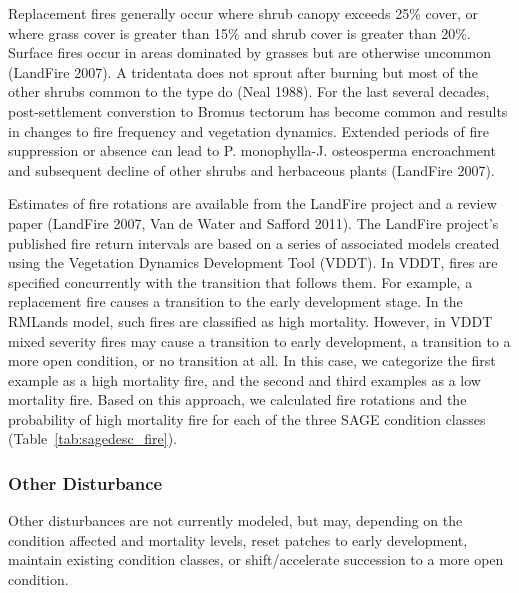 Replacement fires generally occur where shrub canopy exceeds 25\% cover, or where grass cover is greater than 15\% and shrub cover is greater than 20\%. Surface fires occur in areas dominated by grasses but are otherwise uncommon (LandFire 2007). A tridentata does not sprout after burning but most of the other shrubs common to the type do (Neal 1988). For the last several decades, post-settlement converstion to Bromus tectorum has become common and results in changes to fire frequency and vegetation dynamics. Extended periods of fire suppression or absence can lead to P. monophylla-J. osteosperma encroachment and subsequent decline of other shrubs and herbaceous plants (LandFire 2007). 

Estimates of fire rotations are available from the LandFire project and a review paper (LandFire 2007, Van de Water and Safford 2011). The LandFire project’s published fire return intervals are based on a series of associated models created using the Vegetation Dynamics Development Tool (VDDT). In VDDT, fires are specified concurrently with the transition that follows them. For example, a replacement fire causes a transition to the early development stage. In the RMLands model, such fires are classified as high mortality. However, in VDDT mixed severity fires may cause a transition to early development, a transition to a more open condition, or no transition at all. In this case, we categorize the first example as a high mortality fire, and the second and third examples as a low mortality fire. Based on this approach, we calculated fire rotations and the probability of high mortality fire for each of the three SAGE condition classes (Table~\ref{tab:sagedesc_fire}). 

\subsubsection{Other Disturbance}
Other disturbances are not currently modeled, but may, depending on the condition affected and mortality levels, reset patches to early development, maintain existing condition classes, or shift/accelerate succession to a more open condition. 

